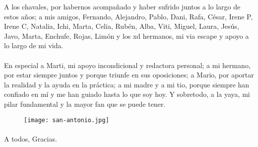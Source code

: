 A los chavales, por habernos acompañado y haber sufrido juntos a lo largo de estos años; a mis amigos, Fernando, Alejandro, Pablo, Dani, Rafa, César, Irene P, Irene C, Natalia, Ichi, Marta, Celia, Rubén, Alba, Viti, Miguel, Laura, Jesús, Javo, Marta, Enchufe, Rojas, Lim\'on y los xd hermanos,  mi via escape y apoyo a lo largo de mi vida.
\paragraph{}
En especial a Marti, mi apoyo incondicional y redactora personal; a mi hermano, por estar siempre juntos y porque triunfe en sus oposiciones; a Mario, por aportar la realidad y la ayuda en la práctica; a mi madre y a mi tio, porque siempre han confiado en mí y me han guiado hasta lo que soy hoy. Y sobretodo, a la yaya, mi pilar fundamental y la mayor fan que se puede tener.
\begin{figure}[h]
    \centering
    \texttt{[image: san-antonio.jpg]}
\end{figure}
\paragraph{}
A todos, Gracias.
